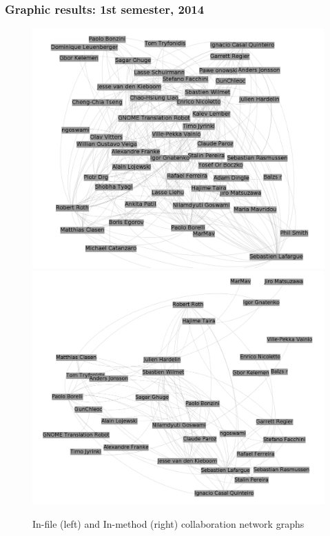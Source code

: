 \documentclass{beamer}
\begin{document}
\begin{frame}
\frametitle{Graphic results: 1st semester, 2014}
\begin{figure}[h!]
\begin{center}
\includegraphics[scale=0.12]{g2014files.png} 
\includegraphics[scale=0.12]{g2014methods.png}
\caption{In-file (left) and In-method (right) collaboration network graphs}
\label{fig:2014}
\end{center}
\end{figure}
\end{frame}
\end{document}

